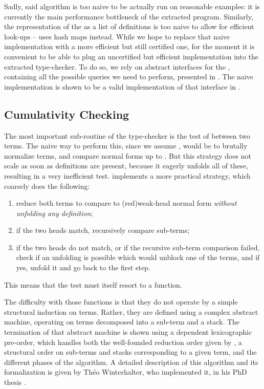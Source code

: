 Sadly, said algorithm is too naive to be actually run on reasonable examples: it is currently the main
performance bottleneck of the extracted program. Similarly, the representation of the
 as a list of definitions is too naive to allow for efficient look-ups –
 uses hash maps instead.
While we hope to replace that naive implementation with a more efficient but still certified one,
for the moment it is convenient to be able to plug an uncertified but efficient implementation
into the extracted type-checker. To do so, we rely on abstract interfaces for the
, containing all the possible queries we need to perform,
presented in . The naive implementation is shown to be a valid implementation of
that interface in .

\subsection{Cumulativity Checking}

The most important sub-routine of the type-checker is the test of  between two terms.
The naive way to perform this, since we assume , would be to brutally normalize terms,
and compare normal forms up to .%
But this strategy does not scale as soon as definitions are present, because it
eagerly unfolds all of these, resulting in a very inefficient test.
 implements a more practical strategy, which coarsely does the following:
\begin{enumerate}
  \item reduce both terms to compare to \kl(red){weak-head} normal form
    \emph{without unfolding any definition};
  \item if the two heads match, recursively compare sub-terms;
  \item if the two heads do not match, or if the recursive sub-term comparison failed, check if
    an unfolding is possible which would unblock one of the terms, and if yes, unfold it and
    go back to the first step.
\end{enumerate}
This means that the  test must itself resort to a 
function.

The difficulty with those functions is that they do not operate by a simple structural induction on
terms. Rather, they are defined using a complex abstract machine, operating on terms decomposed into
a sub-term and a stack. The termination of that abstract machine is shown using a
dependent lexicographic pre-order, which handles both the well-founded reduction order given by
, a structural order on sub-terms and stacks corresponding to a given term, and
the different phases of the algorithm.
A detailed description of this algorithm and its formalization%
 is given by Théo Winterhalter,
who implemented it, in his PhD thesis .

